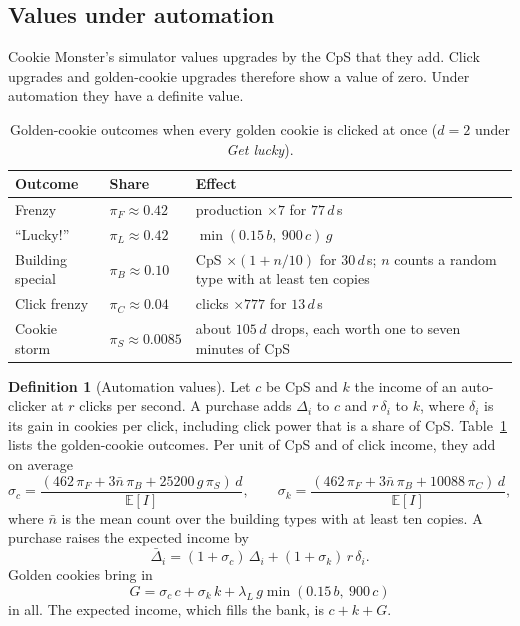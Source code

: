 \documentclass[11pt,a4paper]{article}
\numberwithin{equation}{section}
\theoremstyle{definition}
\newtheorem{definition}[theorem]{Definition}
\theoremstyle{remark}
\newcommand{\E}{\mathbb E}
\newcommand{\Lucky}{\textup{``Lucky!''}}
\begin{document}
\subsection{Values under automation}\label{sec:automation}
Cookie Monster's simulator values upgrades by the CpS that they add. Click upgrades and golden-cookie upgrades therefore show a value of zero. Under automation they have a definite value.

\begin{table}[t]
\centering
\small
\begin{tabular}{@{}llp{7.6cm}@{}}
\toprule
Outcome & Share & Effect \\
\midrule
Frenzy & $\pi_F\approx0.42$ & production $\times7$ for $77\,d$\,s \\
\Lucky{} & $\pi_L\approx0.42$ & $\min(0.15\,b,\ 900\,c)\,g$ \\
Building special & $\pi_B\approx0.10$ & CpS $\times(1+n/10)$ for $30\,d$\,s; $n$ counts a random type with at least ten copies \\
Click frenzy & $\pi_C\approx0.04$ & clicks $\times777$ for $13\,d$\,s \\
Cookie storm & $\pi_S\approx0.0085$ & about $105\,d$ drops, each worth one to seven minutes of CpS \\
\bottomrule
\end{tabular}
\caption{Golden-cookie outcomes when every golden cookie is clicked at once ($d=2$ under \emph{Get lucky}).}
\label{tab:outcomes}
\end{table}

\begin{definition}[Automation values]\label{def:auto}
Let $c$ be CpS and $k$ the income of an auto-clicker at $r$ clicks per second. A purchase adds $\Delta_i$ to $c$ and $r\,\delta_i$ to $k$, where $\delta_i$ is its gain in cookies per click, including click power that is a share of CpS. Table~\ref{tab:outcomes} lists the golden-cookie outcomes. Per unit of CpS and of click income, they add on average
\begin{equation}\label{eq:sigma}
 \sigma_c=\frac{(462\,\pi_F+3\bar n\,\pi_B+25200\,g\,\pi_S)\,d}{\E[I]},\qquad
 \sigma_k=\frac{(462\,\pi_F+3\bar n\,\pi_B+10088\,\pi_C)\,d}{\E[I]},
\end{equation}
where $\bar n$ is the mean count over the building types with at least ten copies. A purchase raises the expected income by
\begin{equation}\label{eq:delta-bar}
 \bar\Delta_i=(1+\sigma_c)\,\Delta_i+(1+\sigma_k)\,r\,\delta_i.
\end{equation}
Golden cookies bring in
\begin{equation}\label{eq:golden-income}
 G=\sigma_c\,c+\sigma_k\,k+\lambda_L\,g\min(0.15\,b,\ 900\,c)
\end{equation}
in all. The expected income, which fills the bank, is $c+k+G$.
\end{definition}
\end{document}
